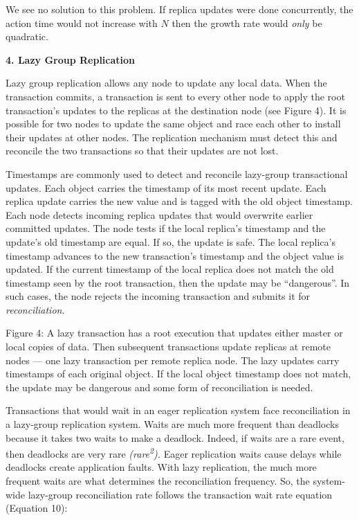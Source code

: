 \documentclass[a4paper,11pt,twoside,openright]{article}
\begin{document}
We see no solution to this problem. If replica updates were done
concurrently, the action time would not increase with \(N\) then the
growth rate would \emph{only} be quadratic.

\textbf{4. Lazy Group Replication}

Lazy group replication allows any node to update any local data. When
the transaction commits, a transaction is sent to every other node to
apply the root transaction's updates to the replicas at the destination
node (see Figure 4). It is possible for two nodes to update the same
object and race each other to install their updates at other nodes. The
replication mechanism must detect this and reconcile the two
transactions so that their updates are not lost.

Timestamps are commonly used to detect and reconcile lazy-group
transactional updates. Each object carries the timestamp of its most
recent update. Each replica update carries the new value and is tagged
with the old object timestamp. Each node detects incoming replica
updates that would overwrite earlier committed updates. The node tests
if the local replica's timestamp and the update's old timestamp are
equal. If so, the update is safe. The local replica's timestamp advances
to the new transaction's timestamp and the object value is updated. If
the current timestamp of the local replica does not match the old
timestamp seen by the root transaction, then the update may be
``dangerous''. In such cases, the node rejects the incoming transaction
and submits it for \emph{reconciliation}.

Figure 4: A lazy transaction has a root execution that updates either
master or local copies of data. Then subsequent transactions update
replicas at remote nodes --- one lazy transaction per remote replica
node. The lazy updates carry timestamps of each original object. If the
local object timestamp does not match, the update may be dangerous and
some form of reconciliation is needed.

Transactions that would wait in an eager replication system face
reconciliation in a lazy-group replication system. Waits are much more
frequent than deadlocks because it takes two waits to make a deadlock.
Indeed, if waits are a rare event, then deadlocks are very rare
\emph{(rare\textsuperscript{2}).} Eager replication waits cause delays
while deadlocks create application faults. With lazy replication, the
much more frequent waits are what determines the reconciliation
frequency. So, the system-wide lazy-group reconciliation rate follows
the transaction wait rate equation (Equation 10):
\end{document}
